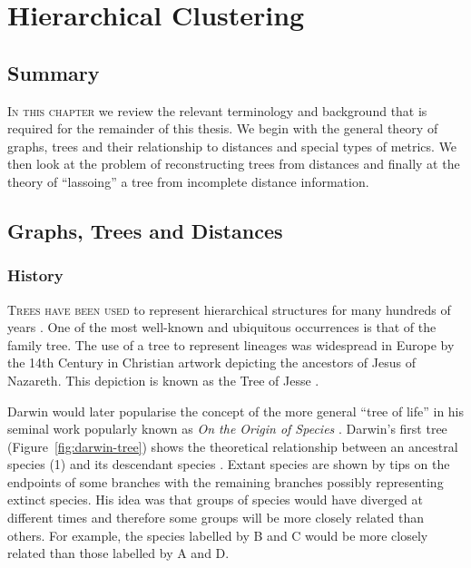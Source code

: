 \chapter{Hierarchical Clustering}
\label{cha:background2}

\section{Summary}
\label{sec:summary}

\textsc{In this chapter} we review the relevant terminology and background
that is required for the remainder of this thesis.  We begin with the general
theory of graphs, trees and their relationship to distances and special types
of metrics.  We then look at the problem of reconstructing trees from
distances and finally at the theory of ``lassoing'' a tree from incomplete
distance information.

\section{Graphs, Trees and Distances}
\label{sec:graphs-trees-dist}

\subsection{History}
\label{sec:history}

\textsc{Trees have been used} to represent hierarchical structures for many
hundreds of years \cite{knuth97taocp1}.  One of the most well-known and
ubiquitous occurrences is that of the family tree.  The use of a tree to
represent lineages was widespread in Europe by the 14th Century in Christian
artwork depicting the ancestors of Jesus of Nazareth.  This depiction is known
as the Tree of Jesse \cite{corblet1860etude}.

Darwin would later popularise the concept of the more general ``tree of life''
in his seminal work popularly known as \textit{On the Origin of Species}
\cite{darwin1859origin}.  Darwin's first tree (Figure~\ref{fig:darwin-tree})
shows the theoretical relationship between an ancestral species (1) and its
descendant species \cite{semple2003phylogenetics}.  Extant species are shown
by tips on the endpoints of some branches with the remaining branches possibly
representing extinct species.  His idea was that groups of species would have
diverged at different times and therefore some groups will be more closely
related than others.  For example, the species labelled by B and C would be
more closely related than those labelled by A and D.

